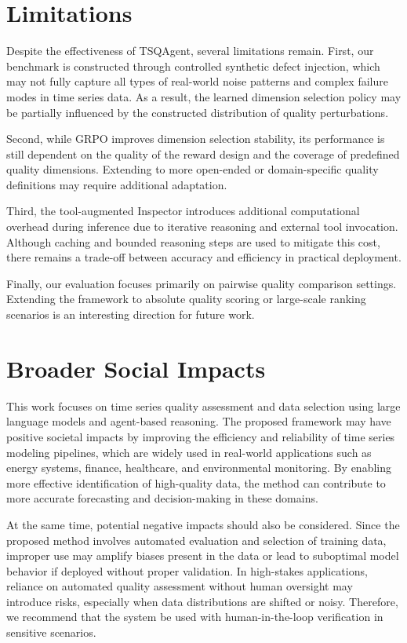 \documentclass{article}
\begin{document}
\section{Limitations}
\label{app:limitations}

Despite the effectiveness of TSQAgent, several limitations remain. First, our benchmark is constructed through controlled synthetic defect injection, which may not fully capture all types of real-world noise patterns and complex failure modes in time series data. As a result, the learned dimension selection policy may be partially influenced by the constructed distribution of quality perturbations.

Second, while GRPO improves dimension selection stability, its performance is still dependent on the quality of the reward design and the coverage of predefined quality dimensions. Extending to more open-ended or domain-specific quality definitions may require additional adaptation.

Third, the tool-augmented Inspector introduces additional computational overhead during inference due to iterative reasoning and external tool invocation. Although caching and bounded reasoning steps are used to mitigate this cost, there remains a trade-off between accuracy and efficiency in practical deployment.

Finally, our evaluation focuses primarily on pairwise quality comparison settings. Extending the framework to absolute quality scoring or large-scale ranking scenarios is an interesting direction for future work.


\section{Broader Social Impacts}
\label{app:broader_impacts}

This work focuses on time series quality assessment and data selection using large language models and agent-based reasoning. The proposed framework may have positive societal impacts by improving the efficiency and reliability of time series modeling pipelines, which are widely used in real-world applications such as energy systems, finance, healthcare, and environmental monitoring. By enabling more effective identification of high-quality data, the method can contribute to more accurate forecasting and decision-making in these domains.

At the same time, potential negative impacts should also be considered. Since the proposed method involves automated evaluation and selection of training data, improper use may amplify biases present in the data or lead to suboptimal model behavior if deployed without proper validation. In high-stakes applications, reliance on automated quality assessment without human oversight may introduce risks, especially when data distributions are shifted or noisy. Therefore, we recommend that the system be used with human-in-the-loop verification in sensitive scenarios.


% 
\end{document}
